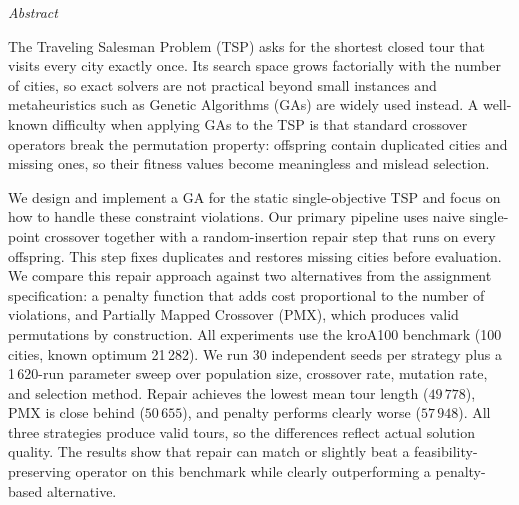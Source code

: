 \clearpage
\thispagestyle{empty}

\begin{center}
{\huge\itshape Abstract\par}
\end{center}
\vspace{1em}

The Traveling Salesman Problem (TSP) asks for the shortest closed tour
that visits every city exactly once. Its search space grows factorially
with the number of cities, so exact solvers are not practical beyond
small instances and metaheuristics such as Genetic Algorithms (GAs) are
widely used instead. A well-known difficulty when applying GAs to the
TSP is that standard crossover operators break the permutation property:
offspring contain duplicated cities and missing ones, so their fitness
values become meaningless and mislead selection.

We design and implement a GA for the static single-objective TSP and
focus on how to handle these constraint violations. Our primary pipeline
uses naive single-point crossover together with a random-insertion
repair step that runs on every offspring. This step fixes duplicates and
restores missing cities before evaluation. We compare this repair
approach against two alternatives from the assignment specification: a
penalty function that adds cost proportional to the number of
violations, and Partially Mapped Crossover (PMX), which produces valid
permutations by construction. All experiments use the kroA100 benchmark
(100 cities, known optimum 21\,282). We run 30 independent seeds per
strategy plus a 1\,620-run parameter sweep over population size,
crossover rate, mutation rate, and selection method. Repair achieves the
lowest mean tour length ($49\,778$), PMX is close behind ($50\,655$),
and penalty performs clearly worse ($57\,948$). All three strategies
produce valid tours, so the differences reflect actual solution quality.
The results show that repair can match or slightly beat a
feasibility-preserving operator on this benchmark while clearly
outperforming a penalty-based alternative.

\clearpage
